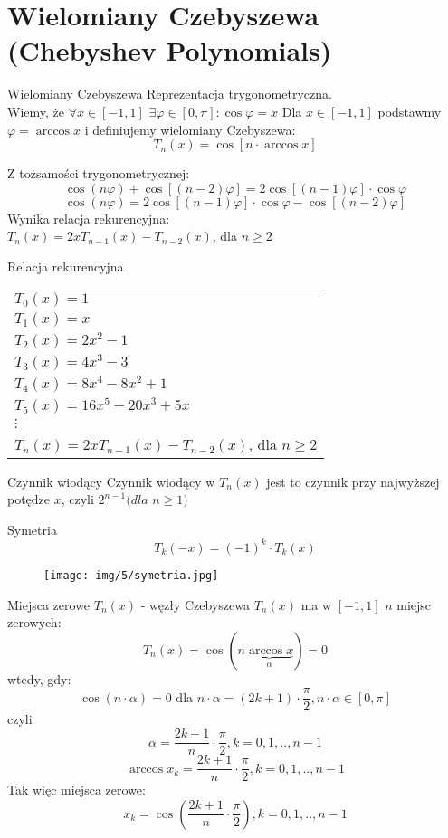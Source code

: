 \section{Wielomiany Czebyszewa (Chebyshev Polynomials)}
\begin{frame}{Wielomiany Czebyszewa}
    Reprezentacja trygonometryczna.\\
    Wiemy, że $\forall x \in [-1,1]$ $\exists \varphi \in [0,\pi]: \cos \varphi = x$ \newline
    Dla $x \in [-1,1]$ podstawmy $\varphi=\arccos x$ i definiujemy wielomiany Czebyszewa:
    $$T_n(x) = \cos[n \cdot \arccos x]$$
    
    Z tożsamości trygonometrycznej:
	$$\cos(n\varphi)+\cos[(n-2)\varphi] = 2\cos[(n-1)\varphi] \cdot \cos \varphi$$
    $$\cos(n\varphi) = 2\cos[(n-1)\varphi] \cdot \cos \varphi - \cos[(n-2)\varphi]$$
    Wynika relacja rekurencyjna:\\
    $T_n(x) = 2xT_{n-1}(x) - T_{n-2}(x)$, dla $n\geqslant2$
\end{frame}
\begin{frame}{Relacja rekurencyjna}
	\begin{tabular}{l}
		$T_0(x) = 1$ \\
        $T_1(x) = x$ \\
        $T_2(x) = 2x^2-1$ \\
        $T_3(x) = 4x^3-3$ \\
        $T_4(x) = 8x^4-8x^2+1$ \\
        $T_5(x) = 16x^5-20x^3+5x$ \\
        $\vdots$ \\
        $T_n(x) = 2xT_{n-1}(x) - T_{n-2}(x)$, dla $n\geqslant2$
	\end{tabular}
    
    \begin{block}{Czynnik wiodący}
    	Czynnik wiodący w $T_n(x)$ jest to czynnik przy najwyższej potędze $x$, czyli $2^{n-1} (dla$ $n\geqslant1)$
    \end{block}
\end{frame}
\begin{frame}{Symetria}
	$$T_k(-x)=(-1)^k \cdot T_k(x)$$
    \begin{figure}
		\texttt{[image: img/5/symetria.jpg]}
	\end{figure}
\end{frame}
\begin{frame}{Miejsca zerowe $T_n(x)$ - węzły Czebyszewa}
	$T_n(x)$ ma w $[-1,1]$ $n$ miejsc zerowych:
    $$T_n(x) = \cos(n \underbrace{\arccos x}_\alpha)=0$$ wtedy, gdy:
    $$\cos(n \cdot \alpha) = 0 \text{ dla } n \cdot \alpha = (2k+1) \cdot \frac{\pi}{2}, n \cdot \alpha \in [0,\pi]$$ 
    czyli 
     $$ \alpha = \frac{2k+1}{n} \cdot \frac{\pi}{2},k=0,1,..,n-1$$
     $$ \arccos x_k = \frac{2k+1}{n} \cdot \frac{\pi}{2},k=0,1,..,n-1$$
     Tak więc miejsca zerowe:\\
     $$x_k = \cos (\frac{2k+1}{n} \cdot \frac{\pi}{2}), k=0,1,..,n-1$$
\end{frame}
